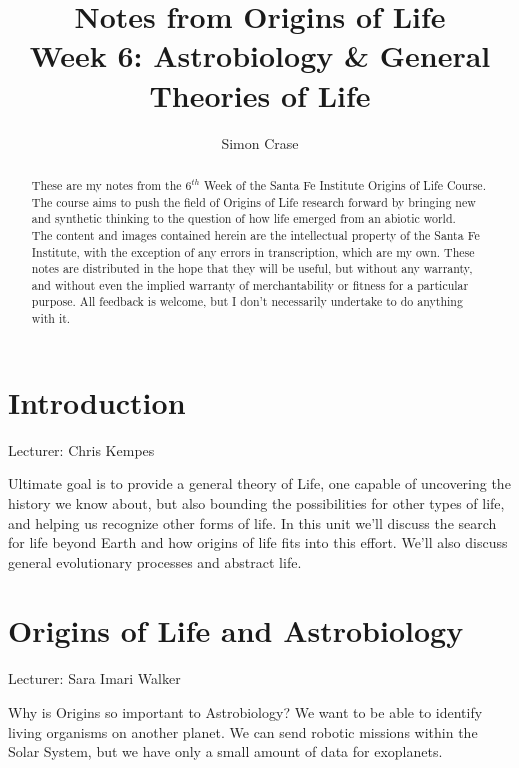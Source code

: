 \documentclass[]{article}
\title{
	Notes from Origins of Life\\
	Week 6: Astrobiology \& General Theories of Life
}
\author{Simon Crase}
\begin{document}
\maketitle

\begin{abstract}
   These are my notes from the $6^{th}$ Week of the Santa Fe Institute Origins of Life Course\cite{sfi2019}. The course aims to push the field of Origins of Life research forward by bringing new and synthetic thinking to the question of how life emerged from an abiotic world.\\
   The content and images contained herein are the intellectual property of the Santa Fe Institute, with the exception of any errors in transcription, which are my own.
   These notes are distributed in the hope that they will be useful,
   but without any warranty, and without even the implied warranty of
   merchantability or fitness for a particular purpose. All feedback is welcome,
   but I don't necessarily undertake to do anything with it.

\end{abstract}

\setcounter{tocdepth}{2}
\tableofcontents

\listoffigures

\section{Introduction}

Lecturer: Chris Kempes

Ultimate goal is to provide a general theory of Life, one capable of uncovering the history we know about, but also bounding the possibilities for other types of life, and helping us recognize other forms of life. In this unit we'll discuss the search for life beyond Earth and how origins of life fits into this effort. We'll also discuss general evolutionary processes and abstract life. 

\section{Origins of Life and Astrobiology}

Lecturer: Sara Imari Walker

Why is Origins so important to Astrobiology? We want to be able to identify living organisms on another planet. We can send robotic missions within the Solar System, but we have only a small amount of data for exoplanets.
\end{document}
